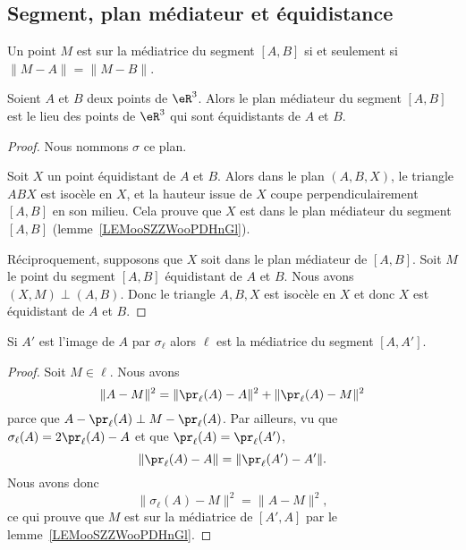 \subsection{Segment, plan médiateur et équidistance}

\begin{lemma}   \label{LEMooSZZWooPDHnGl}
	Un point \( M\) est sur la médiatrice du segment \( [A,B]\) si et seulement si \( \| M-A \|=\| M-B \|\).
\end{lemma}

\begin{lemma}       \label{LEMooVBVUooOTFFXT}
	Soient \( A\) et \( B\) deux points de \( \eR^3\). Alors le plan médiateur du segment \( [A,B]\) est le lieu des points de \( \eR^3\) qui sont équidistants de \( A\) et \( B\).
\end{lemma}

\begin{proof}
	Nous nommons \( \sigma\) ce plan.

	Soit \( X\) un point équidistant de \( A\) et \( B\). Alors dans le plan \( (A,B,X)\), le triangle \( ABX\) est isocèle en \( X\), et la hauteur issue de \( X\) coupe perpendiculairement \( [A,B]\) en son milieu. Cela prouve que \( X\) est dans le plan médiateur du segment \( [A,B]\) (lemme~\ref{LEMooSZZWooPDHnGl}).

	Réciproquement, supposons que \( X\) soit dans le plan médiateur de \( [A,B]\). Soit \( M\) le point du segment \( [A,B]\) équidistant de \( A\) et \( B\). Nous avons \( (X,M)\perp (A,B)\). Donc le triangle \( A,B,X\) est isocèle en \( X\) et donc \( X\) est équidistant de \( A\) et \( B\).
\end{proof}

\begin{lemma}       \label{LEMooTCIEooXdyuHu}
	Si \( A'\) est l'image de \( A\) par \( \sigma_{\ell}\) alors \( \ell\) est la médiatrice du segment \( [A,A']\).
\end{lemma}

\begin{proof}
	Soit \( M\in\ell\). Nous avons
	\begin{equation}
		\| A-M \|^2=\| \pr_{\ell}(A)-A \|^2+\| \pr_{\ell}(A)-M \|^2
	\end{equation}
	parce que \( A-\pr_{\ell}(A)\perp M-\pr_{\ell}(A)\). Par ailleurs, vu que \( \sigma_{\ell}(A)=2\pr_{\ell}(A)-A\) et que \( \pr_{\ell}(A)=\pr_{\ell}(A')\),
	\begin{equation}
		\| \pr_{\ell}(A)-A \|=\| \pr_{\ell}(A')-A' \|.
	\end{equation}
	Nous avons donc
	\begin{equation}
		\| \sigma_{\ell}(A)-M \|^2=\| A-M \|^2,
	\end{equation}
	ce qui prouve que \( M\) est sur la médiatrice de \( [A',A]\) par le lemme~\ref{LEMooSZZWooPDHnGl}.
\end{proof}

